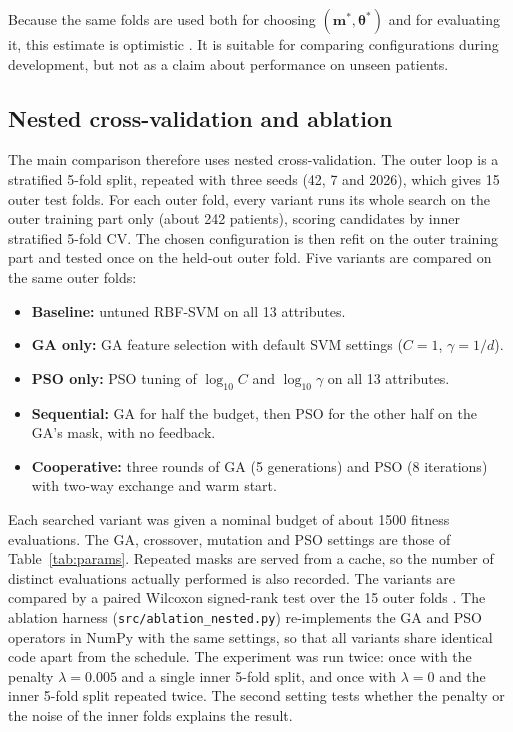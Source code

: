 \documentclass[MTech]{ugthesis}
\begin{document}
Because the same folds are used both for choosing $(\mathbf{m}^{*},\boldsymbol{\theta}^{*})$ and for evaluating it, this estimate is optimistic \citep{varma2006bias,cawley2010overfitting}. It is suitable for comparing configurations during development, but not as a claim about performance on unseen patients.

\subsection{Nested cross-validation and ablation}
\label{sec:nested}
The main comparison therefore uses nested cross-validation. The outer loop is a stratified 5-fold split, repeated with three seeds (42, 7 and 2026), which gives 15 outer test folds. For each outer fold, every variant runs its whole search on the outer training part only (about 242 patients), scoring candidates by inner stratified 5-fold CV. The chosen configuration is then refit on the outer training part and tested once on the held-out outer fold. Five variants are compared on the same outer folds:
\begin{itemize}
\item \textbf{Baseline:} untuned RBF-SVM on all 13 attributes.
\item \textbf{GA only:} GA feature selection with default SVM settings ($C=1$, $\gamma=1/d$).
\item \textbf{PSO only:} PSO tuning of $\log_{10}C$ and $\log_{10}\gamma$ on all 13 attributes.
\item \textbf{Sequential:} GA for half the budget, then PSO for the other half on the GA's mask, with no feedback.
\item \textbf{Cooperative:} three rounds of GA (5 generations) and PSO (8 iterations) with two-way exchange and warm start.
\end{itemize}
Each searched variant was given a nominal budget of about 1500 fitness evaluations. The GA, crossover, mutation and PSO settings are those of Table~\ref{tab:params}. Repeated masks are served from a cache, so the number of distinct evaluations actually performed is also recorded. The variants are compared by a paired Wilcoxon signed-rank test over the 15 outer folds \citep{demsar2006stats}. The ablation harness (\texttt{src/ablation\_nested.py}) re-implements the GA and PSO operators in NumPy with the same settings, so that all variants share identical code apart from the schedule. The experiment was run twice: once with the penalty $\lambda=0.005$ and a single inner 5-fold split, and once with $\lambda=0$ and the inner 5-fold split repeated twice. The second setting tests whether the penalty or the noise of the inner folds explains the result.
\end{document}
